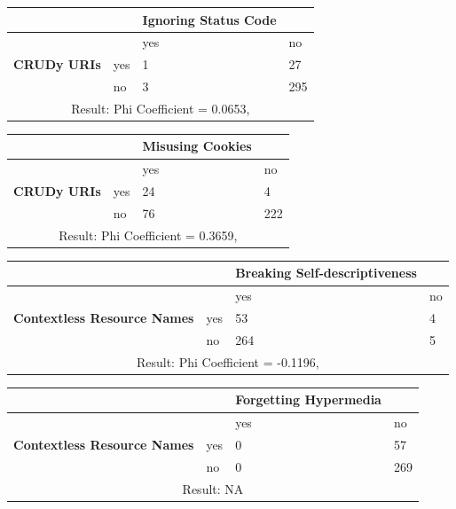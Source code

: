 \documentclass[a4paper,12pt]{article}
\begin{document}
\begin{center}
  \begin{tabular}{| p{60mm} | p{10mm} | p{35mm} | p{35mm} |}
  \hline
   & & \textbf{Ignoring Status Code} &
  \\
  \hline
  & & yes & no
  \\
  \hline
  \textbf{CRUDy URIs} & yes & 1 & 27
  \\
  \hline
   & no & 3 & 295
  \\
  \hline
  \multicolumn{4}{|c|}{Result: Phi Coefficient = 0.0653, }
  \\ \hline
  \end{tabular}
  \end{center}

\begin{center}
  \begin{tabular}{| p{60mm} | p{10mm} | p{35mm} | p{35mm} |}
  \hline
   & & \textbf{Misusing Cookies} &
  \\
  \hline
  & & yes & no
  \\
  \hline
  \textbf{CRUDy URIs} & yes & 24 & 4
  \\
  \hline
   & no & 76 & 222
  \\
  \hline
  \multicolumn{4}{|c|}{Result: Phi Coefficient = 0.3659, }
  \\ \hline
  \end{tabular}
  \end{center}

\begin{center}
  \begin{tabular}{| p{60mm} | p{10mm} | p{35mm} | p{35mm} |}
  \hline
   & & \textbf{Breaking Self-descriptiveness} &
  \\
  \hline
  & & yes & no
  \\
  \hline
  \textbf{Contextless Resource Names} & yes & 53 & 4
  \\
  \hline
   & no & 264 & 5
  \\
  \hline
  \multicolumn{4}{|c|}{Result: Phi Coefficient = -0.1196, }
  \\ \hline
  \end{tabular}
  \end{center}

\begin{center}
  \begin{tabular}{| p{60mm} | p{10mm} | p{35mm} | p{35mm} |}
  \hline
   & & \textbf{Forgetting Hypermedia} &
  \\
  \hline
  & & yes & no
  \\
  \hline
  \textbf{Contextless Resource Names} & yes & 0 & 57
  \\
  \hline
   & no & 0 & 269
  \\
  \hline
  \multicolumn{4}{|c|}{Result: NA}
  \\ \hline
  \end{tabular}
  \end{center}
\end{document}
